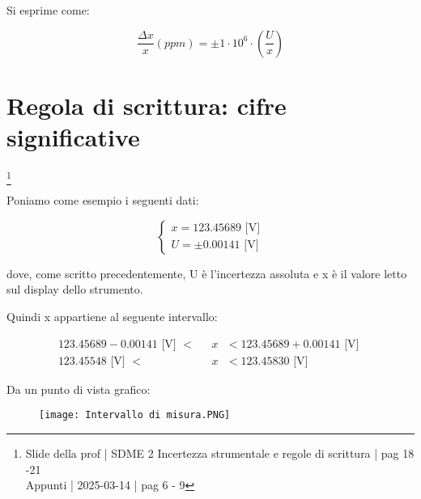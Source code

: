 Si esprime come: 

{
    \Large 
    \begin{equation}
        \frac{\Delta x}{x} (ppm) 
        = 
        \pm 1 \cdot 10^{6} \cdot \left(\frac{U}{x}\right)
    \end{equation}
}

\newpage 

\section{Regola di scrittura: cifre significative}
\footnote{Slide della prof | SDME 2 Incertezza strumentale e regole di scrittura | pag 18 -21 \\  
Appunti | 2025-03-14 | pag 6 - 9}

Poniamo come esempio i seguenti dati: 

{
    \Large 
    \begin{equation}
        \begin{cases}
            x = 123.456 89 \text{ [V]} 
            \\ 
            U = \pm 0.001 41 \text{ [V]}
        \end{cases}
    \end{equation}
}

dove, come scritto precedentemente, U è l'incertezza assoluta e x è il valore letto sul display dello strumento. \newline 

Quindi x appartiene al seguente intervallo: 

{
    \Large 
    \begin{equation}
        \begin{split}
            123.456 89 - 0.001 41 \text{ [V] }
            < 
            \text{ }
            &x 
            \text{ }
            < 
            123.456 89 + 0.001 41 \text{ [V] }
            \\
            123.455 48 \text{ [V] }
            < 
            \text{ }
            &x 
            \text{ }
            < 
            123.458 30 \text{ [V] }
        \end{split}
    \end{equation}
}

Da un punto di vista grafico: 

\begin{figure}[h]
    \centering
    \texttt{[image: Intervallo di misura.PNG]}
\end{figure}

